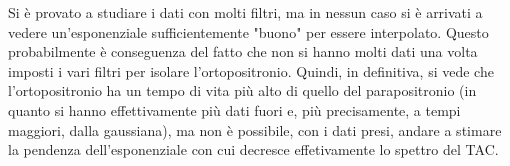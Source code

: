 Si è provato a studiare i dati con molti filtri, ma in nessun caso si è arrivati a vedere un'esponenziale sufficientemente "buono" per essere interpolato. Questo
probabilmente è conseguenza del fatto che non si hanno molti dati una volta imposti i vari filtri per isolare l'ortopositronio. Quindi, in definitiva, si vede che
l'ortopositronio ha un tempo di vita più alto di quello del parapositronio (in quanto si hanno effettivamente più dati fuori e, più precisamente, a tempi maggiori, dalla
gaussiana), ma non è possibile, con i dati presi, andare a stimare la pendenza dell'esponenziale con cui decresce effetivamente lo spettro del TAC.


